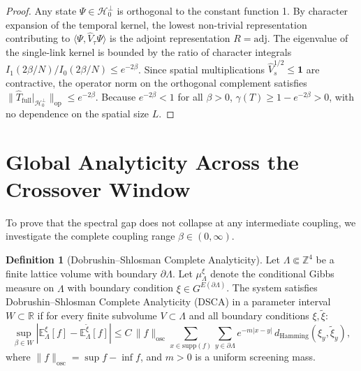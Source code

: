 \documentclass[11pt,reqno]{amsart}
\theoremstyle{plain}
\theoremstyle{definition}
\newtheorem{definition}[theorem]{Definition}
\theoremstyle{remark}
\numberwithin{equation}{section}
\newcommand{\op}{\mathrm{op}}
\newcommand{\osc}{\mathrm{osc}}
\begin{document}
\begin{proof}
Any state $\Psi \in \mathcal{H}_0^\perp$ is orthogonal to the constant function 1. By character expansion of the temporal kernel, the lowest non-trivial representation contributing to $\langle \Psi, \hat{V}_\tau \Psi \rangle$ is the adjoint representation $R = \mathrm{adj}$. The eigenvalue of the single-link kernel is bounded by the ratio of character integrals $I_1(2\beta/N) / I_0(2\beta/N) \le e^{-2\beta}$. Since spatial multiplications $\hat{V}_s^{1/2} \le \mathbf{1}$ are contractive, the operator norm on the orthogonal complement satisfies $\|\hat{T}_{\mathrm{full}}|_{\mathcal{H}_0^\perp}\|_{\op} \le e^{-2\beta}$. Because $e^{-2\beta} < 1$ for all $\beta > 0$, $\gamma(T) \ge 1 - e^{-2\beta} > 0$, with no dependence on the spatial size $L$.
\end{proof}

\section{Global Analyticity Across the Crossover Window}
\label{sec:analyticity}

To prove that the spectral gap does not collapse at any intermediate coupling, we investigate the complete coupling range $\beta \in (0, \infty)$.

\begin{definition}[Dobrushin--Shlosman Complete Analyticity]
Let $\Lambda \Subset \mathbb{Z}^4$ be a finite lattice volume with boundary $\partial \Lambda$. Let $\mu_\Lambda^\xi$ denote the conditional Gibbs measure on $\Lambda$ with boundary condition $\xi \in G^{E(\partial \Lambda)}$. The system satisfies Dobrushin--Shlosman Complete Analyticity (DSCA) in a parameter interval $W \subset \mathbb{R}$ if for every finite subvolume $V \subset \Lambda$ and all boundary conditions $\xi, \tilde{\xi}$:
\begin{equation}
\sup_{\beta \in W} \left| \mathbb{E}_{\Lambda}^\xi [f] - \mathbb{E}_{\Lambda}^{\tilde{\xi}} [f] \right| \le C \, \|f\|_{\osc} \sum_{x \in \mathrm{supp}(f)} \sum_{y \in \partial \Lambda} e^{-m |x - y|} \, d_{\mathrm{Hamming}}(\xi_y, \tilde{\xi}_y),
\end{equation}
where $\|f\|_{\osc} = \sup f - \inf f$, and $m > 0$ is a uniform screening mass.
\end{definition}
\end{document}
